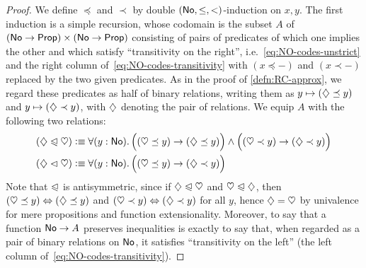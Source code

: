 \begin{proof}
  We define $\preceq$ and $\prec$ by double $(\mathsf{No},\le,<)$-induction on $x,y$.
  The first induction is a simple recursion, whose codomain is the subset $A$ of $(\mathsf{No}\to\mathsf{Prop})\times (\mathsf{No}\to\mathsf{Prop})$ consisting of pairs of predicates of which one implies the other and which satisfy ``transitivity on the right'', i.e.~\eqref{eq:NO-codes-unstrict} and the right column of~\eqref{eq:NO-codes-transitivity} with $(x\preceq -)$ and $(x\prec -)$ replaced by the two given predicates.
  As in the proof of \autoref{defn:RC-approx}, we regard these predicates as half of binary relations, writing them as $y\mapsto (\diamondsuit\preceq y)$ and $y\mapsto (\diamondsuit\prec y)$, with $\diamondsuit$ denoting the pair of relations.
  We equip $A$ with the following two relations:
  \begin{align*}
    (\hlname \ble \hlbname) &\defeq
    \fall{y:\NO} \Big( (\hleb y) \to (\hle y) \Big) \land
    \Big( (\hltb y) \to (\hlt y) \Big)\\
    (\hlname \blt \hlbname) &\defeq
    \fall{y:\NO} \Big( (\hleb y) \to (\hlt y) \Big)
  \end{align*}
  Note that $\trianglelefteqslant$ is antisymmetric, since if $\diamondsuit \trianglelefteqslant \heartsuit$ and $\heartsuit \trianglelefteqslant \diamondsuit$, then $(\heartsuit\preceq y) \Leftrightarrow (\diamondsuit\preceq y)$ and $(\heartsuit\prec y) \Leftrightarrow (\diamondsuit\prec y)$ for all $y$, hence $\diamondsuit=\heartsuit$ by univalence for mere propositions and function extensionality.
  Moreover, to say that a function $\mathsf{No}\to A$ preserves inequalities is exactly to say that, when regarded as a pair of binary relations on $\mathsf{No}$, it satisfies ``transitivity on the left'' (the left column of~\eqref{eq:NO-codes-transitivity}).


\end{proof}

